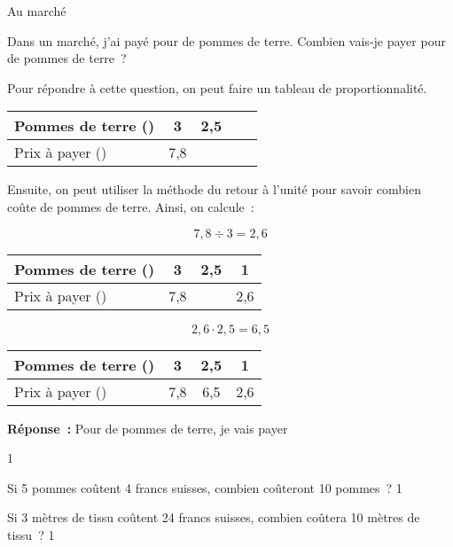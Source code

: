 \documentclass[a4paper,11pt]{report}
\begin{document}
\begin{resolu}{Au marché}
	{Dans un marché, j'ai payé  pour  de pommes de terre. Combien vais-je payer pour  de pommes de terre~?

{\color{blue} Pour répondre à cette question, on peut faire un tableau de proportionnalité. 

\begin{center}
\begin{tabular}{|l|c|c|c|}\hline
	Pommes de terre (\tunit{}{\kg}) & 3 & 2,5  & $\quad$ \\\hline
	Prix à payer (\tunit{}{\fr}) & 7,8 & $\quad$ & $\quad$ \\\hline
\end{tabular}
\end{center}

Ensuite, on peut utiliser la méthode du retour à l'unité pour savoir combien coûte  de pommes de terre. Ainsi, on calcule~:

$$7,8 \div 3 =2,6  $$



\begin{center}
\begin{tabular}{|l|c|c|c|}\hline
	Pommes de terre (\tunit{}{\kg}) & 3  & 2,5 & 1    \\\hline
	Prix à payer (\tunit{}{\fr}) & 7,8 & $\quad$ & 2,6   \\\hline
\end{tabular}
\end{center}

$$2,6 \cdot 2,5 = 6,5$$

\begin{center}
\begin{tabular}{|l|c|c|c|}\hline
	Pommes de terre (\tunit{}{\kg}) & 3   & 2,5 & 1 \\\hline
	Prix à payer (\tunit{}{\fr}) & 7,8  & 6,5 & 2,6 \\\hline
\end{tabular}
\end{center}  }

{\bf Réponse~:} Pour  de pommes de terre, je vais payer 
}
{1}
\end{resolu}

\begin{exo}%
{Si 5 pommes coûtent 4 francs suisses, combien coûteront 10 pommes~?
}{1}
\end{exo}

\begin{exo} %
{Si 3 mètres de tissu coûtent 24 francs suisses, combien coûtera 10 mètres de tissu~?
}{1}
\end{exo}
\end{document}
